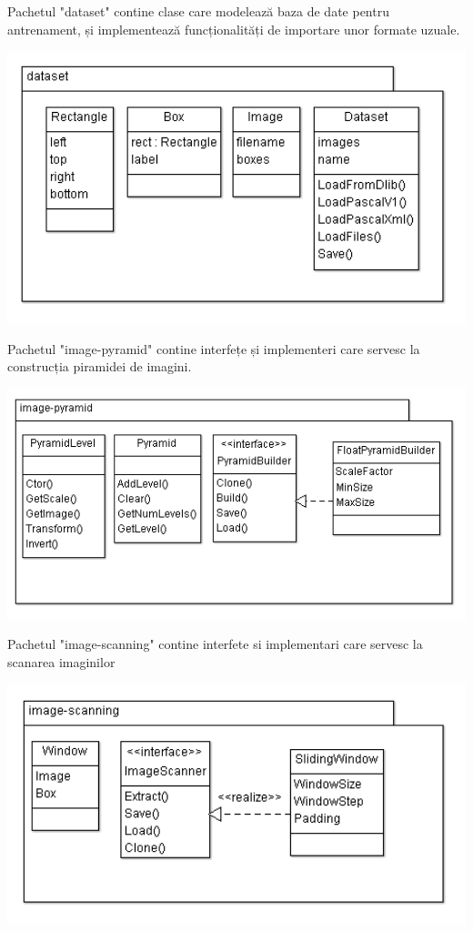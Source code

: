 Pachetul "dataset" contine clase care modelează baza de date pentru antrenament, și implementează funcționalități de importare unor formate uzuale.
\begin{center}
	\includegraphics[width=1.00\textwidth]{uml/dataset_diagram.png}
\end{center}

Pachetul "image-pyramid" contine interfețe și implementeri care servesc la construcția piramidei de imagini.
\begin{center}
	\includegraphics[width=1.00\textwidth]{uml/pyramid_diagram.png}
\end{center}

Pachetul "image-scanning" contine interfete si implementari care servesc la scanarea imaginilor
\begin{center}
	\includegraphics[width=1.00\textwidth]{uml/image_scanning_diagram.png}
\end{center}

